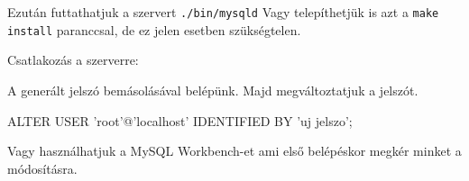 Ezután futtathatjuk a szervert
\texttt{./bin/mysqld}
Vagy telepíthetjük is azt a \texttt{make install} paranccsal, de ez jelen esetben szükségtelen.



Csatlakozás a szerverre:
A generált jelszó bemásolásával belépünk. Majd megváltoztatjuk a jelszót.
\begin{python}
ALTER USER 'root'@'localhost' IDENTIFIED BY 'uj jelszo';
\end{python}
Vagy használhatjuk a MySQL Workbench-et ami első belépéskor megkér minket a módosításra.



